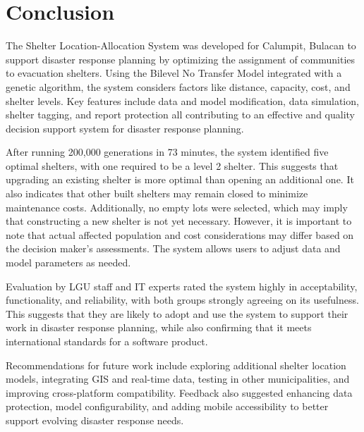 \documentclass[12pt,a4paper,]{article}
\begin{document}
\section{Conclusion}

	The Shelter Location-Allocation System was developed for Calumpit, Bulacan to support disaster response planning by optimizing the assignment of communities to evacuation shelters. Using the Bilevel No Transfer Model integrated with a genetic algorithm, the system considers factors like distance, capacity, cost, and shelter levels. Key features include data and model modification, data simulation, shelter tagging, and report protection all contributing to an effective and quality decision support system for disaster response planning. 
	
	After running 200,000 generations in 73 minutes, the system identified five optimal shelters, with one required to be a level 2 shelter. This suggests that upgrading an existing shelter is more optimal than opening an additional one. It also indicates that other built shelters may remain closed to minimize maintenance costs. Additionally, no empty lots were selected, which may imply that constructing a new shelter is not yet necessary. However, it is important to note that actual affected population and cost considerations may differ based on the decision maker's assessments. The system allows users to adjust data and model parameters as needed. 
	
	Evaluation by LGU staff and IT experts rated the system highly in acceptability, functionality, and reliability, with both groups strongly agreeing on its usefulness. This suggests that they are likely to adopt and use the system to support their work in disaster response planning, while also confirming that it meets international standards for a software product.
	
	Recommendations for future work include exploring additional shelter location models, integrating GIS and real-time data, testing in other municipalities, and improving cross-platform compatibility. Feedback also suggested enhancing data protection, model configurability, and adding mobile accessibility to better support evolving disaster response needs.
	
\printbibliography[heading=bibintoc,title={REFERENCES}] %
\end{document}

